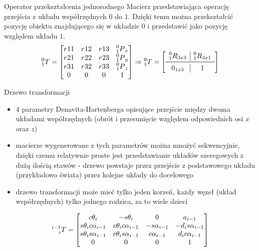
\begin{frame}
{Operator przekształcenia jednorodnego}
Macierz przedstawiająca operację przejścia z układu współrzędnych $0$ do $1$.
Dzięki temu można przekształcić pozycję obiektu znajdującego się w układzie $0$ i przedstawić jako pozycję względem układu $1$.
\begin{equation*}
	\prescript{0}{1}T = 
	\begin{bmatrix}
		r_{}11 	& r_{}12	&	r_{}13	& \prescript{0}{1}P_x \\
		r_{}21 	& r_{}22	&	r_{}23	& \prescript{0}{1}P_y \\
		r_{}31 	& r_{}32	& r_{}33	& \prescript{0}{1}P_z \\
		0				&	0				&	0				&	1										\\
	\end{bmatrix}
	\Rightarrow
		\prescript{0}{1}T = 
	 \left[ \begin{array}{c|c}
   \prescript{0}{1}R_{3x3} 	& \prescript{0}{1}R_{3x1} \\
   \midrule
   0_{1x3}									& 1												\\
\end{array}\right]
\end{equation*}
\end{frame}



\begin{frame}
{Drzewo transformacji}
	\begin{itemize}
		\item 4 parametry Denavita-Hartenberga opisujące przejście między dwoma układami współrzędnych (obrót i przesunięcie względem odpowiednich osi $x$ oraz $z$)
		\item macierze wygenerowane z tych parametrów można mnożyć sekwencyjnie, dzięki czemu relatywnie proste jest przedstawianie układów szeregowych z dużą ilością stawów - drzewo powstaje przez przejście z podstawowego układu (przykładowo świata) przez kolejne układy do docelowego
		\item drzewo transformacji może mieć tylko jeden korzeń, każdy węzeł (układ współrzędnych) tylko jednego rodzica, za to wiele dzieci
	\end{itemize}
	
	
	\begin{equation*}
		\prescript{i-1}{i}T = 
		\begin{bmatrix}
			c\theta_i	&	-s\theta_i	& 0 &	a_{i-1}	\\
			s\theta_ic\alpha_{i-1}	&	c\theta_ic\alpha_{i-1}	&	-s\alpha_{i-1}	&	-d_is\alpha_{i-1}	\\
			s\theta_is\alpha_{i-1}	&	c\theta_is\alpha_{i-1}	&	c\alpha_{i-1}		&	d_ic\alpha_{i-1}\\
			0	&	0	&	0	&	1	\\
		\end{bmatrix}
	\end{equation*}
\end{frame}

